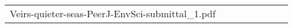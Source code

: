 \begin{longtable}[]{@{}lr|rrr|rrr@{}}
Veirs-quieter-seas-PeerJ-EnvSci-submittal_1.pdf
\end{longtable}